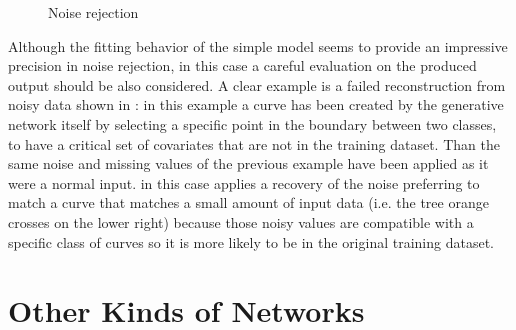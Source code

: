 \begin{figure}
    \centering
    \caption{ Noise rejection } 
    \label{fig:step1_noise}
\end{figure}
Although the fitting behavior of the simple  model seems to provide an impressive precision in noise rejection, in this case a careful evaluation on the produced output should be also considered. A clear example is a failed reconstruction from noisy data shown in \Figure{\ref{fig:step1_noise_rejection_failed}}: in this example a curve has been created by the generative network itself by selecting a specific point in the boundary between two classes, to have a critical set of covariates that are not in the training dataset. Than the same noise and missing values of the previous example have been applied as it were a normal input.  in this case applies a recovery of the noise preferring to match a curve that matches a small amount of input data (i.e. the tree orange crosses on the lower right) because those noisy values are compatible with a specific class of curves so it is more likely to be in the original training dataset.





\section{Other Kinds of Networks}

